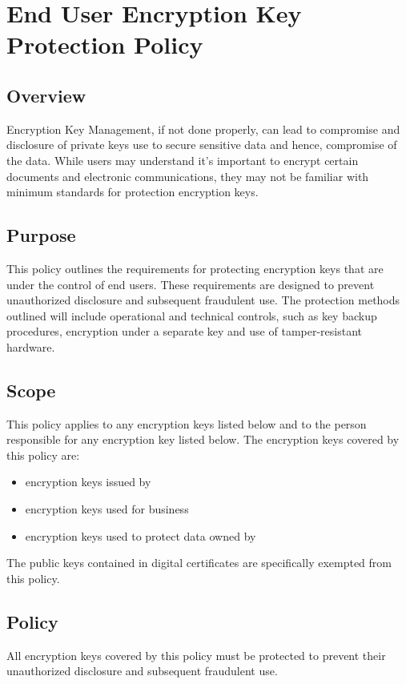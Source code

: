 \chapter{End User Encryption Key Protection Policy}
\CommonIntroduction
\section{Overview}
Encryption Key Management, if not done properly, can lead to compromise and disclosure of private keys use to secure sensitive data and hence, compromise of the data.  
While users may understand it's important to encrypt certain documents and electronic communications, they may not be familiar with minimum standards for protection encryption keys.
\section{Purpose}
This policy outlines the requirements for protecting encryption keys that are under the control of end users.  
These requirements are designed to prevent unauthorized disclosure and subsequent fraudulent use.  
The protection methods outlined will include operational and technical controls, such as key backup procedures, encryption under a separate key\oxford{} and use of tamper-resistant hardware.
\section{Scope}
This policy applies to any encryption keys listed below and to the person responsible for any encryption key listed below.  
The encryption keys covered by this policy are:
\begin{itemize}
\item encryption keys issued by \CompanyName{}
\item encryption keys used for \CompanyName{} business
\item encryption keys used to protect data owned by \CompanyName{}
\end{itemize}
The public keys contained in digital certificates are specifically exempted from this policy.
\section{Policy}
All encryption keys covered by this policy must be protected to prevent their unauthorized disclosure and subsequent fraudulent use.
